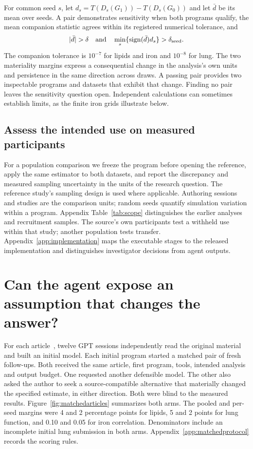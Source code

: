 \documentclass[sigconf,anonymous,review]{acmart}
\begin{document}
For common seed $s$, let $d_s=T(D_s(G_1))-T(D_s(G_0))$ and let $\bar d$ be its mean over seeds. A pair demonstrates sensitivity when both programs qualify, the mean companion statistic agrees within its registered numerical tolerance, and
\[
   |\bar d|>\delta
   \quad\text{and}\quad
   \min_s\{\operatorname{sign}(\bar d)d_s\}>\delta_{\rm seed}.
\]
The companion tolerance is $10^{-7}$ for lipids and iron and $10^{-8}$ for lung. The two materiality margins express a consequential change in the analysis's own units and persistence in the same direction across draws. A passing pair provides two inspectable programs and datasets that exhibit that change. Finding no pair leaves the sensitivity question open. Independent calculations can sometimes establish limits, as the finite iron grids illustrate below.

\subsection{Assess the intended use on measured participants}
For a population comparison we freeze the program before opening the reference, apply the same estimator to both datasets, and report the discrepancy and measured sampling uncertainty in the units of the research question. The reference study's sampling design is used where applicable. Authoring sessions and studies are the comparison units; random seeds quantify simulation variation within a program. Appendix Table~\ref{tab:scope} distinguishes the earlier analyses and recruitment samples. The source's own participants test a withheld use within that study; another population tests transfer. Appendix~\ref{app:implementation} maps the executable stages to the released implementation and distinguishes investigator decisions from agent outputs.

\section{Can the agent expose an assumption that changes the answer?}
\label{sec:matched}
For each article~\cite{kavishe,polishspi,zhu}, twelve GPT sessions independently read the original material and built an initial model. Each initial program started a matched pair of fresh follow-ups. Both received the same article, first program, tools, intended analysis and output budget. One requested another defensible model. The other also asked the author to seek a source-compatible alternative that materially changed the specified estimate, in either direction. Both were blind to the measured results. Figure~\ref{fig:matchedarticles} summarizes both arms. The pooled and per-seed margins were 4 and 2 percentage points for lipids, 5 and 2 points for lung function, and 0.10 and 0.05 for iron correlation. Denominators include an incomplete initial lung submission in both arms. Appendix~\ref{app:matchedprotocol} records the scoring rules.
\end{document}
